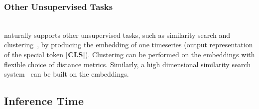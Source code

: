 \begin{sloppypar}
\subsubsection{\textbf{Other Unsupervised Tasks}\nopunct}\ \\
\system naturally supports other unsupervised tasks, such as similarity search and clustering~\cite{lin1995fast,keogh2001dimensionality,liao2005clustering}, by producing the embedding of one timeseries (output representation of the special token \textbf{[CLS]}).
Clustering can be performed on the embeddings with flexible choice of distance metrics. Similarly, a high dimensional similarity search system~\cite{johnson2019billion, malkov2018efficient, jegou2010product} can be built on the embeddings. 


\subsection{Inference Time}
\label{sec.sup.evaltime}





\begin{table}[htbp]
\centering
\small
{}
\caption{Inference time:  Classification on multi-variate data \quad \quad \quad (seconds).}
\label{tab.infcls}
\end{table}







\begin{table}[htbp]
\centering
\small
{}
\caption{Inference time: Imputation on multi-variate data (seconds). }
\label{tab.infimp}
\vspace{-5mm}
\end{table}



\end{sloppypar}
